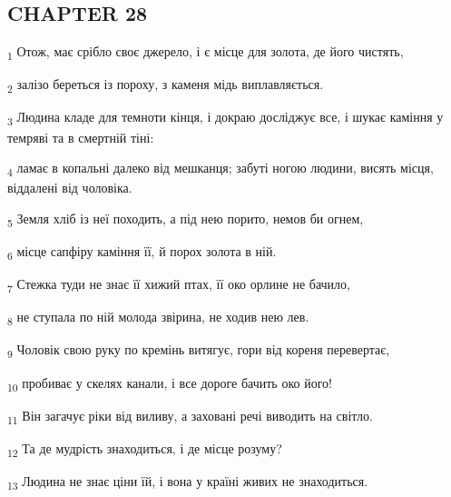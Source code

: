 \subsection{CHAPTER 28}
\begin{tcolorbox}
\textsubscript{1} Отож, має срібло своє джерело, і є місце для золота, де його чистять,
\end{tcolorbox}
\begin{tcolorbox}
\textsubscript{2} залізо береться із пороху, з каменя мідь виплавляється.
\end{tcolorbox}
\begin{tcolorbox}
\textsubscript{3} Людина кладе для темноти кінця, і докраю досліджує все, і шукає каміння у темряві та в смертній тіні:
\end{tcolorbox}
\begin{tcolorbox}
\textsubscript{4} ламає в копальні далеко від мешканця; забуті ногою людини, висять місця, віддалені від чоловіка.
\end{tcolorbox}
\begin{tcolorbox}
\textsubscript{5} Земля хліб із неї походить, а під нею порито, немов би огнем,
\end{tcolorbox}
\begin{tcolorbox}
\textsubscript{6} місце сапфіру каміння її, й порох золота в ній.
\end{tcolorbox}
\begin{tcolorbox}
\textsubscript{7} Стежка туди не знає її хижий птах, її око орлине не бачило,
\end{tcolorbox}
\begin{tcolorbox}
\textsubscript{8} не ступала по ній молода звірина, не ходив нею лев.
\end{tcolorbox}
\begin{tcolorbox}
\textsubscript{9} Чоловік свою руку по кремінь витягує, гори від кореня перевертає,
\end{tcolorbox}
\begin{tcolorbox}
\textsubscript{10} пробиває у скелях канали, і все дороге бачить око його!
\end{tcolorbox}
\begin{tcolorbox}
\textsubscript{11} Він загачує ріки від виливу, а заховані речі виводить на світло.
\end{tcolorbox}
\begin{tcolorbox}
\textsubscript{12} Та де мудрість знаходиться, і де місце розуму?
\end{tcolorbox}
\begin{tcolorbox}
\textsubscript{13} Людина не знає ціни їй, і вона у країні живих не знаходиться.
\end{tcolorbox}
